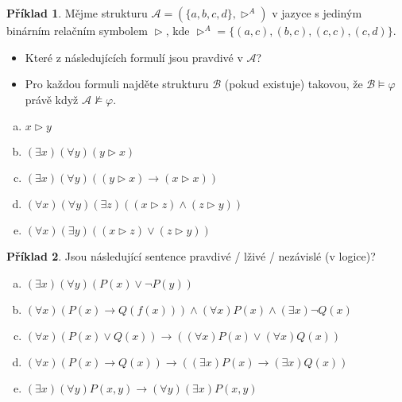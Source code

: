 \documentclass[a4paper]{article}
\theoremstyle{definition}
\newtheorem{problem}{Příklad}
\begin{document}
    
\medskip\begin{problem}
    Mějme strukturu $\mathcal{A}=(\{a,b,c,d\},\vartriangleright^{A})$ v jazyce s jediným binárním relačním symbolem $\vartriangleright$, kde $\vartriangleright^{A}=\{(a,c), (b,c), (c,c), (c,d)\}$. 
    \begin{itemize}
        \item Které z následujících formulí jsou pravdivé v $\mathcal A$? 
        \item Pro každou formuli najděte strukturu $\mathcal{B}$ (pokud existuje) takovou, že $\mathcal{B}\models \varphi$ právě když $\mathcal{A}\not\models \varphi$.
    \end{itemize}    
    \begin{enumerate}[(a)]
       \item $x \vartriangleright y$
       \item $(\exists x)(\forall y)(y \vartriangleright x)$
       \item $(\exists x)(\forall y)((y \vartriangleright x) \to (x \vartriangleright x))$
       \item $(\forall x)(\forall y)(\exists z)((x \vartriangleright z)\wedge(z \vartriangleright y))$
       \item $(\forall x)(\exists y)((x \vartriangleright z)\vee(z \vartriangleright y))$
    \end{enumerate}
\end{problem}
    
    
\medskip\begin{problem}
    Jsou následující sentence pravdivé / lživé / nezávislé (v logice)?
    \begin{enumerate}[(a)]
     \item $(\exists x)(\forall y)(P(x) \vee \neg P(y))$
    \item $(\forall x)(P(x)\to Q(f(x))) \wedge (\forall x)P(x) \wedge (\exists x)\neg Q(x)$
      \item $(\forall x)(P(x) \vee Q(x)) \to ((\forall x)P(x) \vee (\forall x)Q(x))$
       \item $(\forall x)(P(x)\to Q(x)) \to ((\exists x)P(x)\to(\exists x)Q(x))$
    \item $(\exists x)(\forall y)P(x,y) \to (\forall y)(\exists x)P(x,y)$
    \end{enumerate}
\end{problem}
    
\end{document}
